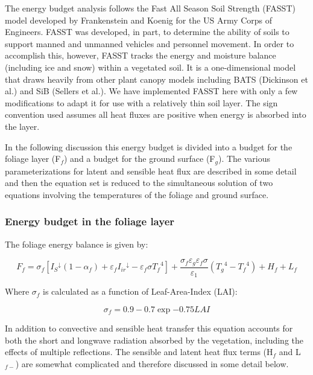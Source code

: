The energy budget analysis follows the Fast All Season Soil Strength (FASST) model developed by Frankenstein and Koenig for the US Army Corps of Engineers. FASST was developed, in part, to determine the ability of soils to support manned and unmanned vehicles and personnel movement. In order to accomplish this, however, FASST tracks the energy and moisture balance (including ice and snow) within a vegetated soil. It is a one-dimensional model that draws heavily from other plant canopy models including BATS (Dickinson et al.) and SiB (Sellers et al.). We have implemented FASST here with only a few modifications to adapt it for use with a relatively thin soil layer. The sign convention used assumes all heat fluxes are positive when energy is absorbed into the layer.

In the following discussion this energy budget is divided into a budget for the foliage layer (F\(_{f}\)) and a budget for the ground surface (F\(_{g}\)). The various parameterizations for latent and sensible heat flux are described in some detail and then the equation set is reduced to the simultaneous solution of two equations involving the temperatures of the foliage and ground surface.

\subsubsection{Energy budget in the foliage layer}\label{energy-budget-in-the-foliage-layer}

The foliage energy balance is given by:

\begin{equation}
{F_f} = {\sigma_f}\left[ {{I_S}^ \downarrow (1 - {\alpha_f}) + {\varepsilon_f}{I_{ir}}^ \downarrow  - {\varepsilon_f}\sigma {T_f}^4} \right] + \frac{{{\sigma_f}{\varepsilon_g}{\varepsilon_f}\sigma }}{{{\varepsilon_1}}}\left( {{T_g}^4 - {T_f}^4} \right) + {H_f} + {L_f}
\end{equation}

Where $\sigma$\(_{f}\) is calculated as a function of Leaf-Area-Index (LAI):

\begin{equation}
\sigma_f = 0.9 - 0.7 \exp{-0.75 LAI }
\end{equation}

In addition to convective and sensible heat transfer this equation accounts for both the short and longwave radiation absorbed by the vegetation, including the effects of multiple reflections. The sensible and latent heat flux terms (H\(_{f}\) and L\(_{f-}\)) are somewhat complicated and therefore discussed in some detail below.

